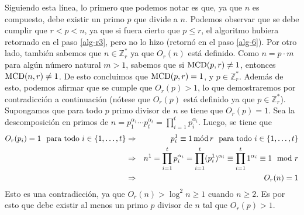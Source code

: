 	
	Siguiendo esta línea, lo primero que podemos notar es que, ya que $n$ es compuesto, debe existir un primo $p$ que divide a $n$. Podemos observar que se debe cumplir que $r<p<n$, ya que si fuera cierto que $p\leq r$, el algoritmo hubiera retornado en el paso \ref{alg-r3}, 
		pero no lo hizo (retornó en el paso \ref{alg-6}). Por otro lado, también sabemos que 
		$n\in\mathbb{Z}_r^*$ ya que $O_r(n)$ está definido. Como $n=p\cdot m$ para algún número natural $m > 1$, sabemos que si $\MCD(p,r)\neq 1$, entonces $\MCD(n,r)\neq 1$. De esto concluimos que $\MCD(p,r)=1$, y $p\in \mathbb{Z}_r^*$.
	Además de esto, podemos afirmar que se cumple que $O_r(p)>1$, lo que demostraremos por contradicción a continuación (nótese que $O_r(p)$ está definido ya que $p \in \mathbb{Z}_r^*$). Supongamos que para todo $p$ primo divisor de $n$ se tiene que $O_r(p)=1$.	Sea la descomposición en primos de $n=p_1^{\alpha_1}\cdots p_t^{\alpha_t}=\prod_{i = 1}^t p_i^{\alpha_i}$. Luego, 
	se tiene que
		\begin{eqnarray*}
			O_r(p_i)=1 \ \text{ para todo } i \in \{1, \ldots, t\} &\Rightarrow &p_i^1 \equiv 1 \mods r \ \text{ para todo } i \in \{1, \ldots, t\}\\
			&\Rightarrow &n^1= \prod_{i=1}^t p_i^{\alpha_i} =\prod_{i = 1}^t (p_i^1)^{\alpha_i}\equiv \prod_{i = 1}^t 1^{\alpha_i}\equiv 1 \mod r\\
			&\Rightarrow &O_r(n)=1
		\end{eqnarray*}		 
		Esto es una contradicción, ya que $O_r(n)>\log^2n\geq 1$ cuando $n\geq 2$. Es por esto que debe existir al menos un primo $p$ divisor de $n$ tal que $O_r(p)>1$. 
		
